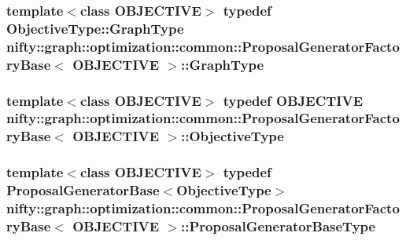\subsubsection[{Graph\+Type}]{\setlength{\rightskip}{0pt plus 5cm}template$<$class O\+B\+J\+E\+C\+T\+I\+V\+E$>$ typedef Objective\+Type\+::\+Graph\+Type {\bf nifty\+::graph\+::optimization\+::common\+::\+Proposal\+Generator\+Factory\+Base}$<$ O\+B\+J\+E\+C\+T\+I\+V\+E $>$\+::{\bf Graph\+Type}}\label{classnifty_1_1graph_1_1optimization_1_1common_1_1ProposalGeneratorFactoryBase_afbc5ea0723729b327417d43729cdf084}
\hypertarget{classnifty_1_1graph_1_1optimization_1_1common_1_1ProposalGeneratorFactoryBase_aa5736d89b93a428099cc2f867266c8c7}{}
\subsubsection[{Objective\+Type}]{\setlength{\rightskip}{0pt plus 5cm}template$<$class O\+B\+J\+E\+C\+T\+I\+V\+E$>$ typedef O\+B\+J\+E\+C\+T\+I\+V\+E {\bf nifty\+::graph\+::optimization\+::common\+::\+Proposal\+Generator\+Factory\+Base}$<$ O\+B\+J\+E\+C\+T\+I\+V\+E $>$\+::{\bf Objective\+Type}}\label{classnifty_1_1graph_1_1optimization_1_1common_1_1ProposalGeneratorFactoryBase_aa5736d89b93a428099cc2f867266c8c7}
\hypertarget{classnifty_1_1graph_1_1optimization_1_1common_1_1ProposalGeneratorFactoryBase_ac2be47e9c7b7a249b3d597831c50405d}{}
\subsubsection[{Proposal\+Generator\+Base\+Type}]{\setlength{\rightskip}{0pt plus 5cm}template$<$class O\+B\+J\+E\+C\+T\+I\+V\+E$>$ typedef {\bf Proposal\+Generator\+Base}$<${\bf Objective\+Type}$>$ {\bf nifty\+::graph\+::optimization\+::common\+::\+Proposal\+Generator\+Factory\+Base}$<$ O\+B\+J\+E\+C\+T\+I\+V\+E $>$\+::{\bf Proposal\+Generator\+Base\+Type}}\label{classnifty_1_1graph_1_1optimization_1_1common_1_1ProposalGeneratorFactoryBase_ac2be47e9c7b7a249b3d597831c50405d}


